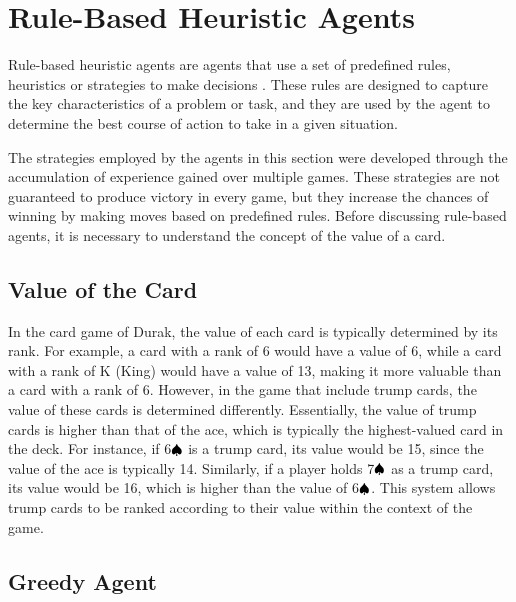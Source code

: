 \section{Rule-Based Heuristic Agents}

Rule-based heuristic agents are agents that use a set of predefined rules, heuristics or strategies to make decisions \citep{millington_funge_2009}. These rules are designed to capture the key characteristics of a problem or task, and they are used by the agent to determine the best course of action to take in a given situation.

The strategies employed by the agents in this section were developed through the accumulation of experience gained over multiple games. These strategies are not guaranteed to produce victory in every game, but they increase the chances of winning by making moves based on predefined rules. Before discussing rule-based agents, it is necessary to understand the concept of the value of a card.

\subsection{Value of the Card}

In the card game of Durak, the value of each card is typically determined by its rank. For example, a card with a rank of 6 would have a value of 6, while a card with a rank of K (King) would have a value of 13, making it more valuable than a card with a rank of 6. However, in the game that include trump cards, the value of these cards is determined differently. Essentially, the value of trump cards is higher than that of the ace, which is typically the highest-valued card in the deck. For instance, if 6$\textcolor{black}{\spadesuit}$ is a trump card, its value would be 15, since the value of the ace is typically 14. Similarly, if a player holds 7$\textcolor{black}{\spadesuit}$ as a trump card, its value would be 16, which is higher than the value of 6$\textcolor{black}{\spadesuit}$. This system allows trump cards to be ranked according to their value within the context of the game.


\subsection{Greedy Agent}

